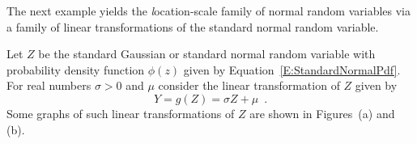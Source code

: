 The next example yields the {\emph location-scale family} of normal random variables via a family of linear transformations of the standard normal random variable.
\begin{example}\label{Eg:LinearTransfStdGaussianGaussian}
Let $Z$ be the standard Gaussian or standard normal random variable with probability density function $\phi(z)$ given by Equation~\eqref{E:StandardNormalPdf}.  
For real numbers $\sigma > 0$ and $\mu$ consider the linear transformation of $Z$ given by 
$$Y = g(Z) = \sigma Z +\mu \enspace .$$
Some graphs of such linear transformations of $Z$ are shown in Figures~(a) and (b).
\begin{figure}[htbp]
\centering{}
\end{figure}


\end{example}
